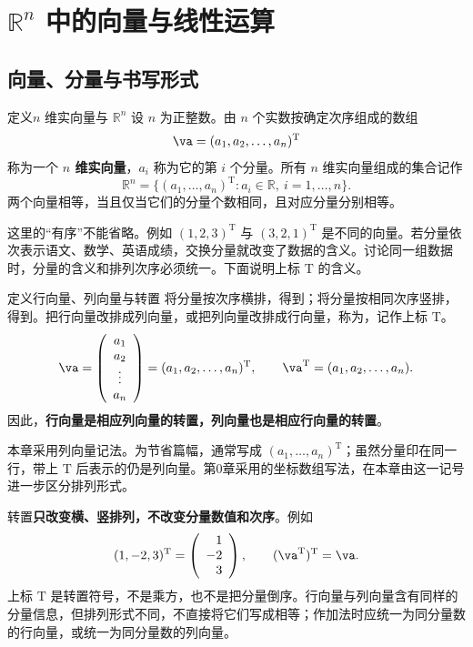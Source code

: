 \documentclass[a4paper,12pt,twoside,openany,fontset=none]{ctexbook}
\newcounter{definition}[chapter]
\newenvironment{definition}[1][]{\begin{defBox}{定义}{#1}}{\end{defBox}}
\numberwithin{equation}{chapter}
\begin{document}
\section{$\mathbb{R}^n$ 中的向量与线性运算}
\label{sec:one-operations}

\subsection*{向量、分量与书写形式}

\begin{definition}[$n$ 维实向量与 $\mathbb{R}^n$]
设 $n$ 为正整数。由 $n$ 个实数按确定次序组成的数组
\[
    \va=(a_1,a_2,\ldots,a_n)^{\mathrm T}
\]
称为一个 \textbf{$n$ 维实向量}，$a_i$ 称为它的第 $i$ 个分量。所有 $n$ 维实向量组成的集合记作
\[
    \mathbb{R}^n=\{(a_1,\ldots,a_n)^{\mathrm T}:a_i\in\mathbb{R},\ i=1,\ldots,n\}.
\]
两个向量相等，当且仅当它们的分量个数相同，且对应分量分别相等。
\end{definition}

这里的“有序”不能省略。例如 $(1,2,3)^{\mathrm T}$ 与 $(3,2,1)^{\mathrm T}$ 是不同的向量。若分量依次表示语文、数学、英语成绩，交换分量就改变了数据的含义。讨论同一组数据时，分量的含义和排列次序必须统一。下面说明上标 $\mathrm T$ 的含义。

\begin{definition}[行向量、列向量与转置]
将分量按次序横排，得到\textbf{}；将分量按相同次序竖排，得到\textbf{}。把行向量改排成列向量，或把列向量改排成行向量，称为\textbf{}，记作上标 $\mathrm T$。
\[
    \va=\left(\begin{array}{c}a_1\\a_2\\\vdots\\a_n\end{array}\right)
        =(a_1,a_2,\ldots,a_n)^{\mathrm T},\qquad
    \va^{\mathrm T}=(a_1,a_2,\ldots,a_n).
\]
因此，\textbf{行向量是相应列向量的转置，列向量也是相应行向量的转置}。
\end{definition}

本章采用列向量记法。为节省篇幅，通常写成 $(a_1,\ldots,a_n)^{\mathrm T}$；虽然分量印在同一行，带上 $\mathrm T$ 后表示的仍是列向量。第0章采用的坐标数组写法，在本章由这一记号进一步区分排列形式。

转置\textbf{只改变横、竖排列，不改变分量数值和次序}。例如
\[
    (1,-2,3)^{\mathrm T}=\left(\begin{array}{r}1\\-2\\3\end{array}\right),
    \qquad (\va^{\mathrm T})^{\mathrm T}=\va.
\]
上标 $\mathrm T$ 是转置符号，不是乘方，也不是把分量倒序。行向量与列向量含有同样的分量信息，但排列形式不同，不直接将它们写成相等；作加法时应统一为同分量数的行向量，或统一为同分量数的列向量。
\end{document}
